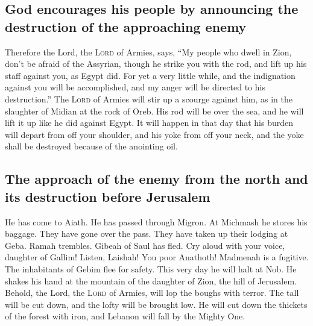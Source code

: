 \hypertarget{god-encourages-his-people-by-announcing-the-destruction-of-the-approaching-enemy}{%
\subsection{God encourages his people by announcing the destruction of
the approaching
enemy}\label{god-encourages-his-people-by-announcing-the-destruction-of-the-approaching-enemy}}

 Therefore the Lord, the \textsc{Lord} of Armies, says,
``My people who dwell in Zion, don't be afraid of the Assyrian, though
he strike you with the rod, and lift up his staff against you, as Egypt
did.  For yet a very little while, and the indignation
against you will be accomplished, and my anger will be directed to his
destruction.''  The \textsc{Lord} of Armies will stir up
a scourge against him, as in the slaughter of Midian at the rock of
Oreb. His rod will be over the sea, and he will lift it up like he did
against Egypt.  It will happen in that day that his
burden will depart from off your shoulder, and his yoke from off your
neck, and the yoke shall be destroyed because of the anointing oil.

\hypertarget{the-approach-of-the-enemy-from-the-north-and-its-destruction-before-jerusalem}{%
\subsection{The approach of the enemy from the north and its destruction
before
Jerusalem}\label{the-approach-of-the-enemy-from-the-north-and-its-destruction-before-jerusalem}}

 He has come to Aiath. He has passed through Migron. At
Michmash he stores his baggage.  They have gone over the
pass. They have taken up their lodging at Geba. Ramah trembles. Gibeah
of Saul has fled.  Cry aloud with your voice, daughter of
Gallim! Listen, Laishah! You poor Anathoth!  Madmenah is
a fugitive. The inhabitants of Gebim flee for safety. 
This very day he will halt at Nob. He shakes his hand at the mountain of
the daughter of Zion, the hill of Jerusalem.  Behold, the
Lord, the \textsc{Lord} of Armies, will lop the boughs with terror. The
tall will be cut down, and the lofty will be brought low.
 He will cut down the thickets of the forest with iron,
and Lebanon will fall by the Mighty One.

